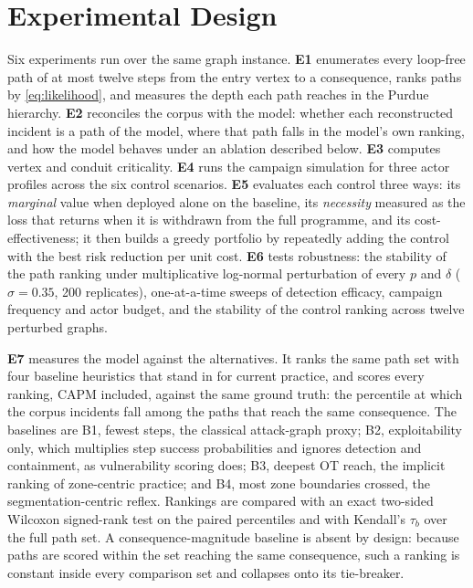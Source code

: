 \section{Experimental Design}
\label{sec:experiments}

Six experiments run over the same graph instance. \textbf{E1} enumerates every
loop-free path of at most twelve steps from the entry vertex to a consequence,
ranks paths by \cref{eq:likelihood}, and measures the depth each path reaches
in the Purdue hierarchy. \textbf{E2} reconciles the corpus with the model:
whether each reconstructed incident is a path of the model, where that path
falls in the model's own ranking, and how the model behaves under an ablation
described below. \textbf{E3} computes vertex and conduit criticality.
\textbf{E4} runs the campaign simulation for three actor profiles across the
six control scenarios. \textbf{E5} evaluates each control three ways: its
\emph{marginal} value when deployed alone on the baseline, its
\emph{necessity} measured as the loss that returns when it is withdrawn from
the full programme, and its cost-effectiveness; it then builds a greedy
portfolio by repeatedly adding the control with the best risk reduction per
unit cost. \textbf{E6} tests robustness: the stability of the path ranking
under multiplicative log-normal perturbation of every $p$ and $\delta$
($\sigma = 0.35$, 200 replicates), one-at-a-time sweeps of detection efficacy,
campaign frequency and actor budget, and the stability of the control ranking
across twelve perturbed graphs.

\textbf{E7} measures the model against the alternatives. It ranks the same path
set with four baseline heuristics that stand in for current practice, and scores
every ranking, CAPM included, against the same ground truth: the percentile at which the corpus incidents fall among
the paths that reach the same consequence. The baselines are B1, fewest steps,
the classical attack-graph proxy; B2, exploitability only, which multiplies step
success probabilities and ignores detection and containment, as vulnerability
scoring does; B3, deepest OT reach, the implicit ranking of zone-centric
practice; and B4, most zone boundaries crossed, the segmentation-centric reflex.
Rankings are compared with an exact two-sided Wilcoxon signed-rank test on the
paired percentiles and with Kendall's $\tau_b$ over the full path set. A consequence-magnitude baseline is absent by design: because paths are scored
within the set reaching the same consequence, such a ranking is constant inside
every comparison set and collapses onto its tie-breaker.

